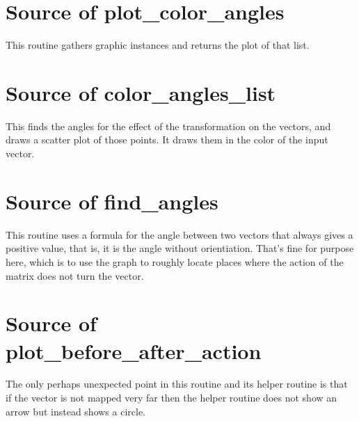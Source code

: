 \section{Source of plot\_color\_angles}
This routine gathers graphic instances and returns the plot of that list.


\section{Source of color\_angles\_list}
This finds the angles for the effect of the transformation on the vectors,
and draws a scatter plot of those points.
It draws them in the color of the input vector.


\section{Source of find\_angles}
This routine uses a formula for the angle between two vectors that 
always gives a positive value, that is, it is the angle without orientiation.
That's fine for purpose here, which is to use the graph to 
roughly locate places where the action of the matrix does not turn the
vector. 



\section{Source of plot\_before\_after\_action}
The only perhaps unexpected point in this routine and its helper routine
is that if the vector is not mapped very far then the helper
routine does not show an arrow but instead shows a circle.



\endinput

TODO

1) Does python intro show 
   > x, y = 5, 7
construct?